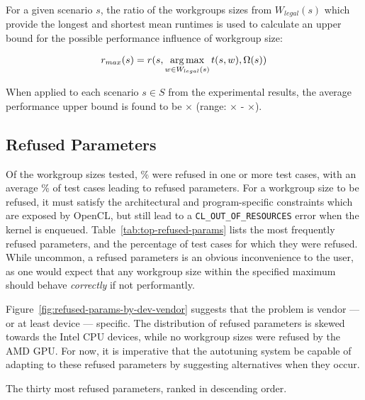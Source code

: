 For a given scenario $s$, the ratio of the workgroups sizes from
$W_{legal}(s)$ which provide the longest and shortest mean runtimes is
used to calculate an upper bound for the possible performance
influence of workgroup size:

\begin{equation}
r_{max}(s) = r(s, \operatorname*{arg\,max}_{w \in W_{legal}(s)} t(s,w), \Omega(s))
\end{equation}

When applied to each scenario $s \in S$ from the experimental results,
the average performance upper bound is found to be
$\times$ (range:
$\times$ -
$\times$).



\subsection{Refused Parameters}

Of the  workgroup sizes tested,
\% were refused in one or more test
cases, with an average \% of test
cases leading to refused parameters. For a workgroup size to be
refused, it must satisfy the architectural and program-specific
constraints which are exposed by OpenCL, but still lead to a
\texttt{CL\_OUT\_OF\_RESOURCES} error when the kernel is
enqueued. Table~\ref{tab:top-refused-params} lists the most frequently
refused parameters, and the percentage of test cases for which they
were refused. While uncommon, a refused parameters is an obvious
inconvenience to the user, as one would expect that any workgroup size
within the specified maximum should behave \emph{correctly} if not
performantly.

Figure~\ref{fig:refused-params-by-dev-vendor} suggests that the
problem is vendor --- or at least device --- specific. The
distribution of refused parameters is skewed towards the Intel CPU
devices, while no workgroup sizes were refused by the AMD
GPU.  For now, it is imperative that the
autotuning system be capable of adapting to these refused parameters
by suggesting alternatives when they occur.

\begin{table}
\parbox{.32\linewidth}{
    \centering
    \scriptsize
    
  }
  \hfill
  \parbox{.32\linewidth}{
    \centering
    \scriptsize
    
  }
  \hfill
  \parbox{.32\linewidth}{
    \centering
    \scriptsize
    
  }
  \caption{The thirty most refused parameters, ranked in descending
    order.}
  \label{tab:top-refused-params}
\end{table}

